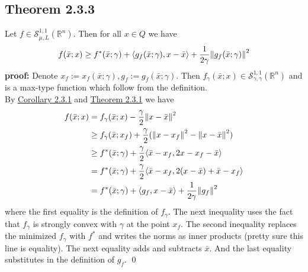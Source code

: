 \documentclass[12pt,a4paper]{article}
\begin{document}
	 \subsection*{Theorem 2.3.3}\label{thm233}
	 Let $f \in \mathcal{S}_{\mu,L}^{1,1}(\mathbb{R}^n)$. Then for all $x \in Q$ we have
	 \begin{align*}
	 	f(\bar{x};x) \geq f^*(\bar{x};\gamma) + \langle g_f(\bar{x};\gamma),x - \bar{x} \rangle + \frac{1}{2\gamma}\norm{g_f(\bar{x};\gamma)}^2
	 \end{align*}
	 \textbf{proof:} Denote $x_f := x_f(\bar{x};\gamma), g_f := g_f(\bar{x};\gamma)$. Then $f_{\gamma}(\bar{x};x) \in \mathcal{S}_{\gamma,\gamma}^{1,1}(\mathbb{R}^n)$ and is a max-type function which follow from the definition. \\
	 By \hyperref[cor231]{Corollary 2.3.1} and \hyperref[thm231]{Theorem 2.3.1} we have
	 \begin{align*}
	 	f(\bar{x};x) &= f_{\gamma}(\bar{x};x) - \frac{\gamma}{2}\norm{x - \bar{x}}^2 \\
	 	&\geq f_{\gamma}(\bar{x};x_f) + \frac{\gamma}{2}(\norm{x - x_f}^2 - \norm{x - \bar{x}}^2) \\
	 	&\geq f^*(\bar{x};\gamma) + \frac{\gamma}{2} \langle \bar{x} - x_f,2x - x_f - \bar{x} \rangle \\
	 	&=f^*(\bar{x};\gamma) + \frac{\gamma}{2} \langle \bar{x} - x_f, 2(x - \bar{x}) + \bar{x} - x_f \rangle \\
	 	&= f^*(\bar{x};\gamma) + \langle g_f,x - \bar{x} \rangle + \frac{1}{2\gamma}\norm{g_f}^2
	 \end{align*}
	 where the first equality is the definition of $f_{\gamma}$. The next inequality uses the fact that $f_{\gamma}$ is strongly convex with $\gamma$ at the point $x_f$. The second inequality replaces the minimized $f_{\gamma}$ with $f^*$ and writes the norms as inner products (pretty sure this line is equality). The next equality adds and subtracts $\bar{x}$. And the last equality substitutes in the definition of $g_f$. \qed \\
\end{document}
